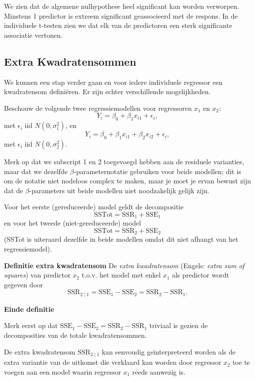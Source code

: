 \documentclass[12pt,dutch,coursenotes]{book}
\theoremstyle{definition}
\theoremstyle{definition}
\theoremstyle{definition}
\theoremstyle{remark}
\begin{document}
We zien dat de algemene nulhypothese heel significant kan worden
verworpen. Minstens 1 predictor is extreem significant geassocieerd met
de respons. In de individuele t-testen zien we dat elk van de
predictoren een sterk significante associatie vertonen.

\subsection{Extra Kwadratensommen}\label{extra-kwadratensommen}

We kunnen een stap verder gaan en voor iedere individuele regressor een
kwadratensom definiëren. Er zijn echter verschillende mogelijkheden.

Beschouw de volgende twee regressiemodellen voor regressoren \(x_1\) en
\(x_2\): \[
  Y_i = \beta_0+\beta_1 x_{i1} + \epsilon_i,
\] met \(\epsilon_i\text{ iid } N(0,\sigma_1^{2})\), en \[
Y_i = \beta_0+\beta_1 x_{i1}+\beta_2 x_{i2} + \epsilon_i,
\] met \(\epsilon_i\text{ iid } N(0,\sigma_2^{2})\).

Merk op dat we subscript 1 en 2 toegevoegd hebben aan de residuele
varianties, maar dat we dezelfde \(\beta\)-parameternotatie gebruiken
voor beide modellen; dit is om de notatie niet nodeloos complex te
maken, maar je moet je ervan bewust zijn dat de \(\beta\)-parameters uit
beide modellen niet noodzakelijk gelijk zijn.

Voor het eerste (gereduceerde) model geldt de decompositie \[
  \text{SSTot} = \text{SSR}_1 + \text{SSE}_1
\] en voor het tweede (niet-gereduceerde) model \[
  \text{SSTot} = \text{SSR}_2 + \text{SSE}_2
\] (SSTot is uiteraard dezelfde in beide modellen omdat dit niet afhangt
van het regressiemodel).

\textbf{Definitie extra kwadratensom} De \emph{extra kwadratensom}
(Engels: \emph{extra sum of squares}) van predictor \(x_2\) t.o.v. het
model met enkel \(x_1\) als predictor wordt gegeven door \[
  \text{SSR}_{2\mid 1} = \text{SSE}_1-\text{SSE}_2=\text{SSR}_2-\text{SSR}_1.
\]

\textbf{Einde definitie}

Merk eerst op dat
\(\text{SSE}_1-\text{SSE}_2=\text{SSR}_2-\text{SSR}_1\) triviaal is
gezien de decomposities van de totale kwadratensommen.

De extra kwadratensom \(\text{SSR}_{2\mid 1}\) kan eenvoudig
geïnterpreteerd worden als de extra variantie van de uitkomst die
verklaard kan worden door regressor \(x_2\) toe te voegen aan een model
waarin regressor \(x_1\) reeds aanwezig is.
\end{document}
